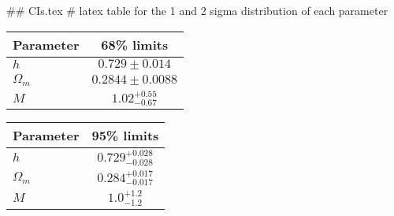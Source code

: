 ## CIs.tex
# latex table for the 1 and 2 sigma distribution of each parameter

\begin{tabular} { l  c}
 Parameter &  68\% limits\\
\hline
{\boldmath$h              $} & $0.729\pm 0.014            $\\
{\boldmath$\Omega_m       $} & $0.2844\pm 0.0088          $\\
{\boldmath$M              $} & $1.02^{+0.55}_{-0.67}      $\\
\hline
\end{tabular}

\begin{tabular} { l  c}
 Parameter &  95\% limits\\
\hline
{\boldmath$h              $} & $0.729^{+0.028}_{-0.028}   $\\
{\boldmath$\Omega_m       $} & $0.284^{+0.017}_{-0.017}   $\\
{\boldmath$M              $} & $1.0^{+1.2}_{-1.2}         $\\
\hline
\end{tabular}

